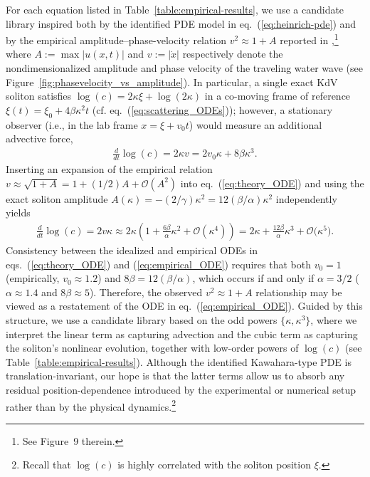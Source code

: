 \documentclass[journal=gmj]{CUP-JNL-DTM}%
\theoremstyle{definition}
\numberwithin{equation}{section}
\begin{document}
For each equation listed in Table~\ref{table:empirical-results}, we use a candidate library inspired both by the identified PDE model in eq.~(\ref{eq:heinrich-pde}) and by the empirical amplitude--phase-velocity relation $v^2 \approx 1 + A$ reported in \cite{Heinrich.etal2025},\footnote{See Figure~9 therein.} where $A := \max|u(x,t)|$ and $v := |\dot{x}|$ respectively denote the nondimensionalized amplitude and phase velocity of the traveling water wave (see Figure~\ref{fig:phasevelocity_vs_amplitude}). In particular, a single exact KdV soliton satisfies $\log(c) = 2\kappa\xi + \log(2\kappa)$ in a co-moving frame of reference $\xi(t) = \xi_0 + 4\beta\kappa^2t$ (cf. eq.~(\ref{eq:scattering_ODEs})); however, a stationary observer (i.e., in the lab frame $x = \xi + v_0t$) would measure an additional advective force, \begin{align}\label{eq:theory_ODE}
    \tfrac{d}{dt}\log(c) = 2\kappa{v} = 2v_0\kappa + 8\beta\kappa^3.
\end{align} Inserting an expansion of the empirical relation $v \approx \sqrt{1 + A} = 1 + (1/2)A + \mathcal{O}(A^2)$ into eq.~(\ref{eq:theory_ODE}) and using the exact soliton amplitude $A(\kappa) = -(2/\gamma)\kappa^2 = 12(\beta/\alpha)\kappa^2$ independently yields \begin{align}\label{eq:empirical_ODE}
    \tfrac{d}{dt}\log(c) = 2v\kappa
    \approx 2\kappa\left(1 + \tfrac{6\beta}{\alpha}\kappa^2 + \mathcal{O}(\kappa^4)\right)
    = 2\kappa + \tfrac{12\beta}{\alpha}\kappa^3 + \mathcal{O}\big(\kappa^5\big).
\end{align} Consistency between the idealized and empirical ODEs in eqs.~(\ref{eq:theory_ODE}) and (\ref{eq:empirical_ODE}) requires that both $v_0 = 1$ (empirically, $v_0 \approx 1.2$) and $8\beta = 12(\beta/\alpha)$, which occurs if and only if $\alpha = 3/2$ ($\alpha \approx 1.4$ and $8\beta \approx 5$). Therefore, the observed $v^2 \approx 1 + A$ relationship may be viewed as a restatement of the ODE in eq.~(\ref{eq:empirical_ODE}). Guided by this structure, we use a candidate library based on the odd powers $\{\kappa, \kappa^3\}$, where we interpret the linear term as capturing advection and the cubic term as capturing the soliton's nonlinear evolution, together with low-order powers of $\log(c)$ (see Table~\ref{table:empirical-results}). Although the identified Kawahara-type PDE is translation-invariant, our hope is that the latter terms allow us to absorb any residual position-dependence introduced by the experimental or numerical setup rather than by the physical dynamics.\footnote{Recall that $\log(c)$ is highly correlated with the soliton position $\xi$.}
\end{document}
